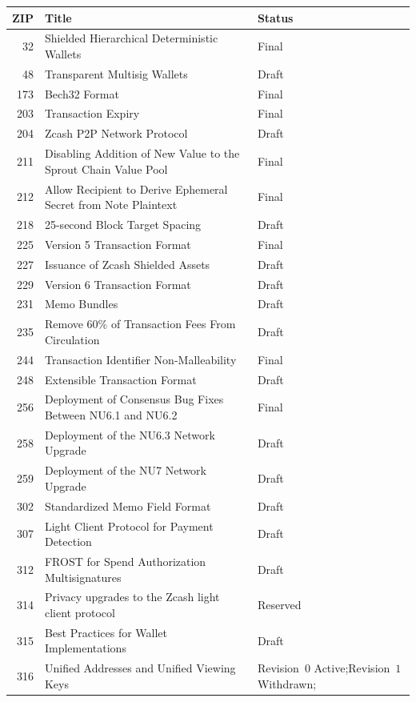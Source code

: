 \documentclass[11pt,a4paper]{article}
\theoremstyle{definition}
\begin{document}
\begin{table}[htbp]
\centering
\small
\begin{tabular}{@{}r p{} p{}@{}}
\toprule
ZIP & Title & Status \\
\midrule
32 & Shielded Hierarchical Deterministic Wallets & Final \\
48 & Transparent Multisig Wallets & Draft \\
173 & Bech32 Format & Final \\
203 & Transaction Expiry & Final \\
204 & Zcash P2P Network Protocol & Draft \\
211 & Disabling Addition of New Value to the Sprout Chain Value Pool
  & Final \\
212 & Allow Recipient to Derive Ephemeral Secret from Note Plaintext
  & Final \\
218 & 25-second Block Target Spacing & Draft \\
225 & Version 5 Transaction Format & Final \\
227 & Issuance of Zcash Shielded Assets & Draft \\
229 & Version 6 Transaction Format & Draft \\
231 & Memo Bundles & Draft \\
235 & Remove 60\% of Transaction Fees From Circulation & Draft \\
244 & Transaction Identifier Non-Malleability & Final \\
248 & Extensible Transaction Format & Draft \\
256 & Deployment of Consensus Bug Fixes Between NU6.1 and NU6.2 & Final \\
258 & Deployment of the NU6.3 Network Upgrade & Draft \\
259 & Deployment of the NU7 Network Upgrade & Draft \\
302 & Standardized Memo Field Format & Draft \\
307 & Light Client Protocol for Payment Detection & Draft \\
312 & FROST for Spend Authorization Multisignatures & Draft \\
314 & Privacy upgrades to the Zcash light client protocol & Reserved \\
315 & Best Practices for Wallet Implementations & Draft \\
316 & Unified Addresses and Unified Viewing Keys
  & Revision~$0$ Active;\newline Revision~$1$ Withdrawn;\newline

\end{tabular}
\end{table}
\end{document}
